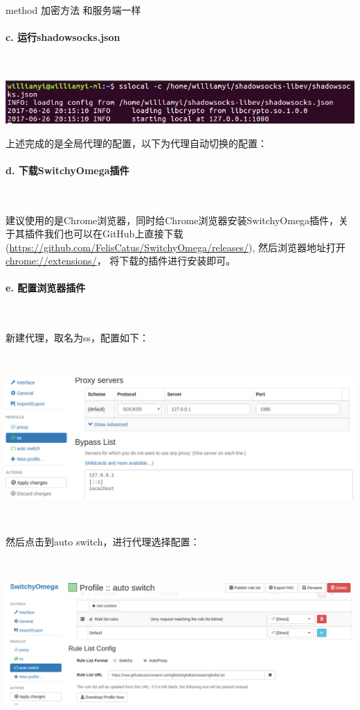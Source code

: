 \documentclass[UTF8, Microsoft YaHei]{book}
\begin{document}
    method 加密方法 和服务端一样


    \paragraph{c. 运行shadowsocks.json}

    ~

    \includegraphics[width=1.0\textwidth]{./img/ss运行.png}

    上述完成的是全局代理的配置，以下为代理自动切换的配置：


    \paragraph{d. 下载SwitchyOmega插件}

    ~

    建议使用的是Chrome浏览器，同时给Chrome浏览器安装SwitchyOmega插件，关于其插件我们也可以在GitHub上直接下载(\url{https://github.com/FelisCatus/SwitchyOmega/releases/}), 然后浏览器地址打开\url{chrome://extensions/}， 将下载的插件进行安装即可。

    \paragraph{e. 配置浏览器插件}

    ~

    新建代理，取名为ss，配置如下：

    ~

    \includegraphics[width=1.0\textwidth]{./img/代理创建.png}

    ~

    然后点击到auto switch，进行代理选择配置：

    ~

    \includegraphics[width=1.0\textwidth]{./img/autoswitch配置.png}
\end{document}
